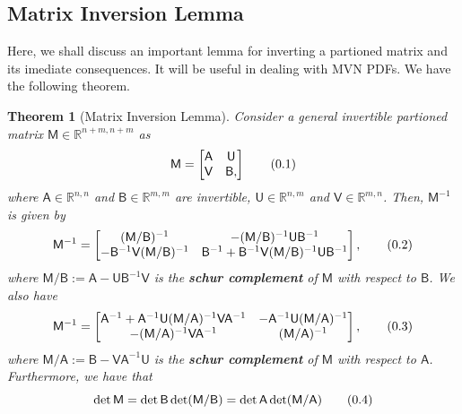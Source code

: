 \documentclass[10pt]{article}
\newtheorem{thm}{Theorem}[section]
\theoremstyle{definition}
\newcommand\eqnum{\addtocounter{equation}{1}\tag{\arabic{section}.\arabic{equation}}}
\begin{document}
\subsection{Matrix Inversion Lemma}
Here, we shall discuss an important lemma for inverting a partioned matrix and its imediate consequences. It will be useful in dealing with MVN PDFs. We have the following theorem.
\begin{thm}[Matrix Inversion Lemma]\label{thm:MIL}
Consider a general invertible partioned matrix $\mathsf{M}\in\mathbb{R}^{n+m,n+m}$ as
\begin{equation*}
\mathsf{M} =
\begin{bmatrix}
\mathsf{A} & \mathsf{U} \\
\mathsf{V} & \mathsf{B},
\end{bmatrix}
\eqnum
\end{equation*}
where $\mathsf{A}\in\mathbb{R}^{n, n}$ and $\mathsf{B}\in\mathbb{R}^{m,m}$ are invertible, $\mathsf{U}\in\mathbb{R}^{n,m}$ and $\mathsf{V}\in\mathbb{R}^{m,n}$. Then, $\mathsf{M}^{-1}$ is given by
\begin{equation*}
\mathsf{M}^{-1} =
\begin{bmatrix}
(\mathsf{M}/\mathsf{B})^{-1} & 
-(\mathsf{M}/\mathsf{B})^{-1}\mathsf{U}\mathsf{B}^{-1} \\
-\mathsf{B}^{-1}\mathsf{V}(\mathsf{M}/\mathsf{B})^{-1} & 
\mathsf{B}^{-1}+\mathsf{B}^{-1}\mathsf{V}(\mathsf{M}/\mathsf{B})^{-1}\mathsf{U}\mathsf{B}^{-1}
\end{bmatrix},
\eqnum
\label{eq:schur:MB}
\end{equation*}
where $\mathsf{M}/\mathsf{B}:=\mathsf{A}-\mathsf{U}\mathsf{B}^{-1}\mathsf{V}$ is the \textbf{schur complement} of $\mathsf{M}$ with respect to $\mathsf{B}$. We also have
\begin{equation*}
\mathsf{M}^{-1} =
\begin{bmatrix}
\mathsf{A}^{-1}+\mathsf{A}^{-1}\mathsf{U}(\mathsf{M}/\mathsf{A})^{-1}\mathsf{V}\mathsf{A}^{-1} & 
-\mathsf{A}^{-1}\mathsf{U} (\mathsf{M}/\mathsf{A})^{-1} \\
-(\mathsf{M}/\mathsf{A})^{-1}\mathsf{V}\mathsf{A}^{-1} & 
(\mathsf{M}/\mathsf{A})^{-1} 
\end{bmatrix},
\eqnum
\label{eq:schur:MA}
\end{equation*}
where $\mathsf{M}/\mathsf{A}:=\mathsf{B}-\mathsf{V}\mathsf{A}^{-1}\mathsf{U}$ is the \textbf{schur complement} of $\mathsf{M}$ with respect to $\mathsf{A}$. Furthermore, we have that
\begin{equation*}
\det\mathsf{M} = \det\mathsf{B}\det(\mathsf{M}/\mathsf{B})= \det\mathsf{A}\det(\mathsf{M}/\mathsf{A})
\eqnum
\label{eq:schur:det}
\end{equation*}
\end{thm}
\end{document}
